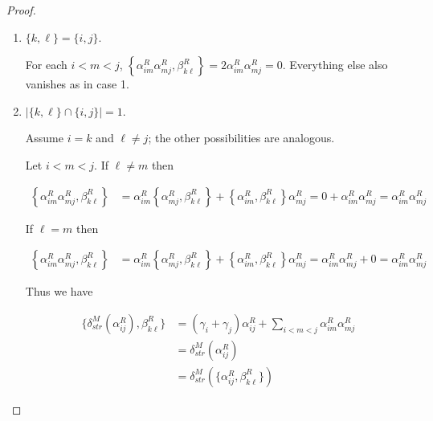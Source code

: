\documentclass[10pt,a4paper]{amsart}
\begin{document}
\begin{proof}
\begin{itemize}
\begin{enumerate}[label=Case \arabic*.]
				Then the second term $(\gamma_i+\gamma_j)\left\{ \alpha_{ij}^R, \beta_{k\ell}^R \right\}$ vanishes. 
				
				For the third term, for each $i<m<j$, the only way $\left\{\alpha_{im}^R\alpha_{mj}^R, \beta_{k\ell}^R \right\}$ might be nonzero is if $m\in \{k,\ell\}$. But even then $\left\{\alpha_{im}^R\alpha_{mj}^R, \beta_{k\ell}^R \right\} = 2\alpha_{im}^R\alpha_{mj}^R = 0$. Therefore the third term vanishes and 
				
				\[ \{\delta_{str}^M(\alpha_{ij}^R), \beta_{k\ell}^R\} = 0\]
				
				Likewise, 
				
				\[ \delta_{str}^M\left(\{\alpha_{ij}^R,\beta_{k\ell}^R\}\right) = 0. \]
				
				\item $\{k, \ell\} = \{i,j\}$.
				
				For each $i<m<j$, $\left\{\alpha_{im}^R\alpha_{mj}^R, \beta_{k\ell}^R \right\} = 2\alpha_{im}^R\alpha_{mj}^R = 0$. Everything else also vanishes as in case 1.
				
				\item $|\{k,\ell\} \cap \{i,j\}| = 1$. 
				
				Assume $i=k$ and $\ell\neq j$; the other possibilities are analogous.
				
				Let $i<m<j$. If $\ell \neq m$ then
				
				\begin{align*}
					\left\{\alpha_{im}^R\alpha_{mj}^R, \beta_{k\ell}^R \right\} &= \alpha_{im}^R\left\{\alpha_{mj}^R, \beta_{k\ell}^R \right\} + \left\{\alpha_{im}^R, \beta_{k\ell}^R \right\}\alpha_{mj}^R =  0+\alpha_{im}^R\alpha_{mj}^R = \alpha_{im}^R\alpha_{mj}^R
				\end{align*}
				
				If $\ell = m$ then
				
				\begin{align*}
					\left\{\alpha_{im}^R\alpha_{mj}^R, \beta_{k\ell}^R \right\} &= \alpha_{im}^R\left\{\alpha_{mj}^R, \beta_{k\ell}^R \right\} + \left\{\alpha_{im}^R, \beta_{k\ell}^R \right\}\alpha_{mj}^R =  \alpha_{im}^R\alpha_{mj}^R+0 = \alpha_{im}^R\alpha_{mj}^R
				\end{align*}
				
				Thus we have 
				
				\begin{align*}
					\{\delta_{str}^M(\alpha_{ij}^R), \beta_{k\ell}^R\} &= (\gamma_i+\gamma_j) \alpha_{ij}^R + \sum_{i<m<j} \alpha_{im}^R\alpha_{mj}^R \\
					&= \delta_{str}^M(\alpha_{ij}^R) \\
					&= \delta_{str}^M\left(\{\alpha_{ij}^R,\beta_{k\ell}^R\}\right)
				\end{align*}
				

\end{enumerate}
\end{itemize}
\end{proof}
\end{document}
